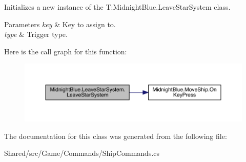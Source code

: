 Initializes a new instance of the T\+:\+Midnight\+Blue.\+Leave\+Star\+System class. 


\begin{DoxyParams}{Parameters}
{\em key} & Key to assign to.\\
\hline
{\em type} & Trigger type.\\
\hline
\end{DoxyParams}
Here is the call graph for this function\+:
\nopagebreak
\begin{figure}[H]
\begin{center}
\leavevmode
\includegraphics[width=350pt]{class_midnight_blue_1_1_leave_star_system_a6793d6a941afd58a9e9030d8aec1fe83_cgraph}
\end{center}
\end{figure}


The documentation for this class was generated from the following file\+:\begin{DoxyCompactItemize}
\item 
Shared/src/\+Game/\+Commands/Ship\+Commands.\+cs\end{DoxyCompactItemize}
